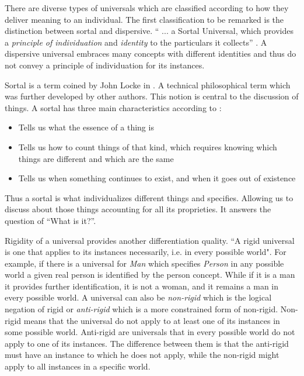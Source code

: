 There are diverse types of universals which are classified according to how they deliver meaning to an individual. The first classification to be remarked is the distinction between sortal and dispersive. `` ... a Sortal Universal, which provides a \textit{principle of individuation} and \textit{identity} to the particulars it collects'' \citep{guizzardi_ontological_2005}. A dispersive universal embraces many concepts with different identities and thus do not convey a principle of individuation for its instances.

Sortal is a term coined by John Locke in \cite{locke1841essay}. A technical philosophical term which was further developed by other authors. This notion is central to the discussion of things. A sortal has three main characteristics according to \cite{sep-sortals}:

\begin{itemize}
    \item Tells us what the essence of a thing is
    \item Tells us how to count things of that kind, which requires knowing which things are different and which are the same
    \item Tells us when something continues to exist, and when it goes out of existence
\end{itemize}

Thus a sortal is what individualizes different things and specifies. Allowing us to discuss about those things accounting for all its proprieties. It answers the question of ``What is it?''.

Rigidity of a universal provides another differentiation quality. ``A rigid universal is one that applies to its instances necessarily, i.e. in every possible world"\citep{guizzardi_ontological_2005}. For example, if there is a universal for \textit{Man} which specifies \textit{Person} in any possible world a given real person is identified by the person concept. While if it is a man it provides further identification, it is not a woman, and it remains a man in every possible world. A universal can also be \textit{non-rigid} which is the logical negation of rigid or \textit{anti-rigid} which is a more constrained form of non-rigid. Non-rigid means that the universal do not apply to at least one of its instances in some possible world. Anti-rigid are universals that in every possible world do not apply to one of its instances. The difference between them is that the anti-rigid must have an instance to which he does not apply, while the non-rigid might apply to all instances in a specific world.


